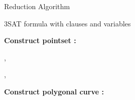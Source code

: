 \documentclass[12pt]{dalthesis}
\begin{document}
\begin{algorithm} 
\caption {{\sc Reduction Algorithm}} 
\label{alg:reduction}
\begin{algorithmic}[1]
	\baselineskip
	\REQUIRE  3SAT formula  with  clauses  and  variables 
	

	\vspace{0.1in}
		
	\hspace{-0.2in} {\bf Construct pointset :}  

	\STATE  \label{l:init}
	



 
	\STATE  \label{l:makeSStart}

	   \label{l:makeSLoop}

	\STATE 
		 \STATE 
	

	   
  
	\STATE , 

	\STATE       		\label{l:ComputeNextEven}
    
		\ELSE
	\STATE ,  
    
	\STATE       		\label{l:ComputeNextOdd}

  





	

	


	\ENDIF
	

  



\STATE 

    \STATE    \label{l:EndLoopPointSet}

	\ENDFOR






	  \label{l:ComputeV}
	  \STATE   
      \STATE   
		\ELSE
	   \STATE   
      \STATE   
	\ENDIF

	\STATE 

	\STATE 

    \STATE  \label{l:makeSEnd}



 	

\vspace{0.15in}

	\hspace{-0.25in} {\bf Construct polygonal curve :}  

	
	\STATE  \label{l:makeP}


\end{algorithmic}
\end{algorithm}
\end{document}
